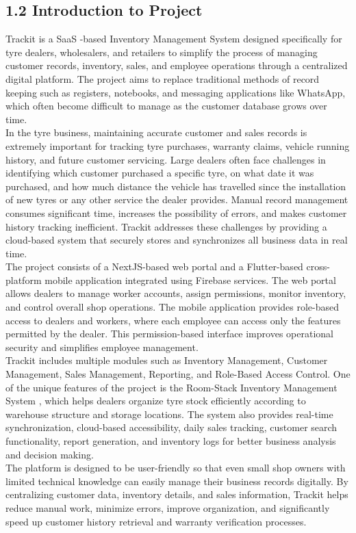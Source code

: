 \documentclass[12pt, oneside]{article}
\begin{document}
\subsection*{1.2 Introduction to Project}
Trackit is a SaaS \cite{saas}-based Inventory Management System designed specifically for tyre dealers, wholesalers, and retailers to simplify the process of managing customer records, inventory, sales, and employee operations through a centralized digital platform. The project aims to replace traditional methods of record keeping such as registers, notebooks, and messaging applications like WhatsApp, which often become difficult to manage as the customer database grows over time.\\[0.25 cm]
In the tyre business, maintaining accurate customer and sales records is extremely important for tracking tyre purchases, warranty claims, vehicle running history, and future customer servicing. Large dealers often face challenges in identifying which customer purchased a specific tyre, on what date it was purchased, and how much distance the vehicle has travelled since the installation of new tyres or any other service the dealer provides. Manual record management consumes significant time, increases the possibility of errors, and makes customer history tracking inefficient. Trackit addresses these challenges by providing a cloud-based system that securely stores and synchronizes all business data in real time.\\[0.25 cm]
The project consists of a NextJS-based web portal and a Flutter-based cross-platform mobile application integrated using Firebase services. The web portal allows dealers to manage worker accounts, assign permissions, monitor inventory, and control overall shop operations. The mobile application provides role-based access to dealers and workers, where each employee can access only the features permitted by the dealer. This permission-based interface improves operational security and simplifies employee management.\\[0.25 cm]
Trackit includes multiple modules such as Inventory Management, Customer Management, Sales Management, Reporting, and Role-Based Access Control. One of the unique features of the project is the Room-Stack Inventory Management System \cite{inventory}, which helps dealers organize tyre stock efficiently according to warehouse structure and storage locations. The system also provides real-time synchronization, cloud-based accessibility, daily sales tracking, customer search functionality, report generation, and inventory logs for better business analysis and decision making.\\[0.25 cm]
The platform is designed to be user-friendly so that even small shop owners with limited technical knowledge can easily manage their business records digitally. By centralizing customer data, inventory details, and sales information, Trackit helps reduce manual work, minimize errors, improve organization, and significantly speed up customer history retrieval and warranty verification processes.
\end{document}
